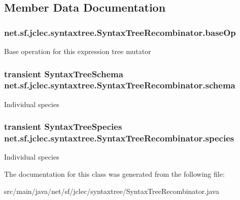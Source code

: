 \subsection{Member Data Documentation}
\hypertarget{classnet_1_1sf_1_1jclec_1_1syntaxtree_1_1_syntax_tree_recombinator_a6f6d5af72b97153a4d40e0b4a7068dc7}{
\subsubsection[{base\-Op}]{ net.\-sf.\-jclec.\-syntaxtree.\-Syntax\-Tree\-Recombinator.\-base\-Op\hspace{0.3cm}{\ttfamily [protected]}}}\label{classnet_1_1sf_1_1jclec_1_1syntaxtree_1_1_syntax_tree_recombinator_a6f6d5af72b97153a4d40e0b4a7068dc7}
Base operation for this expression tree mutator \hypertarget{classnet_1_1sf_1_1jclec_1_1syntaxtree_1_1_syntax_tree_recombinator_a3a0a7080f1e3456f556d910fee16d893}{
\subsubsection[{schema}]{\setlength{\rightskip}{0pt plus 5cm}transient {\bf Syntax\-Tree\-Schema} net.\-sf.\-jclec.\-syntaxtree.\-Syntax\-Tree\-Recombinator.\-schema\hspace{0.3cm}{\ttfamily [protected]}}}\label{classnet_1_1sf_1_1jclec_1_1syntaxtree_1_1_syntax_tree_recombinator_a3a0a7080f1e3456f556d910fee16d893}
Individual species \hypertarget{classnet_1_1sf_1_1jclec_1_1syntaxtree_1_1_syntax_tree_recombinator_a80172c0a1184bdd5f3665abda4072bd6}{
\subsubsection[{species}]{\setlength{\rightskip}{0pt plus 5cm}transient {\bf Syntax\-Tree\-Species} net.\-sf.\-jclec.\-syntaxtree.\-Syntax\-Tree\-Recombinator.\-species\hspace{0.3cm}{\ttfamily [protected]}}}\label{classnet_1_1sf_1_1jclec_1_1syntaxtree_1_1_syntax_tree_recombinator_a80172c0a1184bdd5f3665abda4072bd6}
Individual species 

The documentation for this class was generated from the following file\-:\begin{DoxyCompactItemize}
\item 
src/main/java/net/sf/jclec/syntaxtree/Syntax\-Tree\-Recombinator.\-java\end{DoxyCompactItemize}
